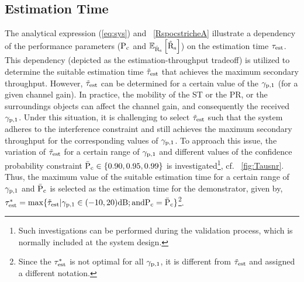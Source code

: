 \subsection{Estimation Time}
\label{esttime}
The analytical expression (\ref{eq:sys}) and \figurename~\ref{RspocstricheA} illustrate a dependency of the performance parameters ($\text{P}_{\text{c}}$ and ${\mathbb E}_{\hat{\text{{R}}}_{\text{s}}}\left[ \hat{\text{{R}}}_{\text{s}} \right]$) on the estimation time $\tau_{\text{est}}$. This dependency (depicted as the estimation-throughput tradeoff) is utilized to determine the suitable estimation time $\tilde{\tau}_{\text{est}}$ that achieves the maximum secondary throughput. However, $\tilde{\tau}_{\text{est}}$ can be determined for a certain value of the ${\gamma}_{\text{p,1}}$ (for a given channel gain). In practice, the mobility of the ST or the PR, or the surroundings objects can affect the channel gain, and consequently the received ${\gamma}_{\text{p,1}}$. Under this situation, it is challenging to select $\tilde{\tau}_{\text{est}}$ such that the system adheres to the interference constraint and still achieves the maximum secondary throughput for the corresponding values of ${\gamma}_{\text{p,1}}$. To approach this issue, the variation of $\tilde{\tau}_{\text{est}}$ for a certain range of ${\gamma}_{\text{p,1}}$ and different values of the confidence probability constraint $\bar{\text{P}}_{\text{c}} \in \{0.90, 0.95, 0.99\}$ is investigated\footnote{Such investigations can be performed during the validation process, which is normally included at the system design.}, cf. \figurename~\ref{fig:Tausnr}. %
Thus, the maximum value of the suitable estimation time for a certain range of ${\gamma}_{\text{p,1}}$ and $\bar{\text{P}}_{\text{c}}$ is selected as the estimation time for the demonstrator, given by, ${\tau}^*_{\text{est}} = \operatorname*{max}\{ \tilde{\tau}_{\text{est}} | {\gamma}_{\text{p,1}} \in (-10,20 )\SI{}{dB}; \text{and} \text{P}_{\text{c}} = \bar{\text{P}}_{\text{c}} \}$\footnote{Since the ${\tau}^*_{\text{est}}$ is not optimal for all ${\gamma}_{\text{p,1}}$, it is different from $\tilde{\tau}_{\text{est}}$ and assigned a different notation.}.  
